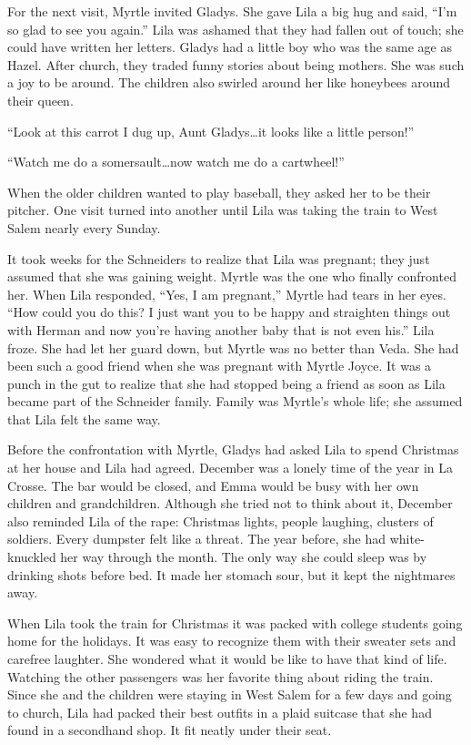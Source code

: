 \documentclass[
  american,
  letterpaper,
]{book}
\begin{document}
For the next visit, Myrtle invited Gladys. She gave Lila a big hug and
said, ``I'm so glad to see you again.'' Lila was ashamed that they had
fallen out of touch; she could have written her letters. Gladys had a
little boy who was the same age as Hazel. After church, they traded
funny stories about being mothers. She was such a joy to be around. The
children also swirled around her like honeybees around their queen.

``Look at this carrot I dug up, Aunt Gladys\ldots it looks like a little
person!''

``Watch me do a somersault\ldots now watch me do a cartwheel!''

When the older children wanted to play baseball, they asked her to be
their pitcher. One visit turned into another until Lila was taking the
train to West Salem nearly every Sunday.

It took weeks for the Schneiders to realize that Lila was pregnant; they
just assumed that she was gaining weight. Myrtle was the one who finally
confronted her. When Lila responded, ``Yes, I am pregnant,'' Myrtle had
tears in her eyes. ``How could you do this? I just want you to be happy
and straighten things out with Herman and now you're having another baby
that is not even his.'' Lila froze. She had let her guard down, but
Myrtle was no better than Veda. She had been such a good friend when she
was pregnant with Myrtle Joyce. It was a punch in the gut to realize
that she had stopped being a friend as soon as Lila became part of the
Schneider family. Family was Myrtle's whole life; she assumed that Lila
felt the same way.

Before the confrontation with Myrtle, Gladys had asked Lila to spend
Christmas at her house and Lila had agreed. December was a lonely time
of the year in La Crosse. The bar would be closed, and Emma would be
busy with her own children and grandchildren. Although she tried not to
think about it, December also reminded Lila of the rape: Christmas
lights, people laughing, clusters of soldiers. Every dumpster felt like
a threat. The year before, she had white-knuckled her way through the
month. The only way she could sleep was by drinking shots before bed. It
made her stomach sour, but it kept the nightmares away.

When Lila took the train for Christmas it was packed with college
students going home for the holidays. It was easy to recognize them with
their sweater sets and carefree laughter. She wondered what it would be
like to have that kind of life. Watching the other passengers was her
favorite thing about riding the train. Since she and the children were
staying in West Salem for a few days and going to church, Lila had
packed their best outfits in a plaid suitcase that she had found in a
secondhand shop. It fit neatly under their seat.
\end{document}
